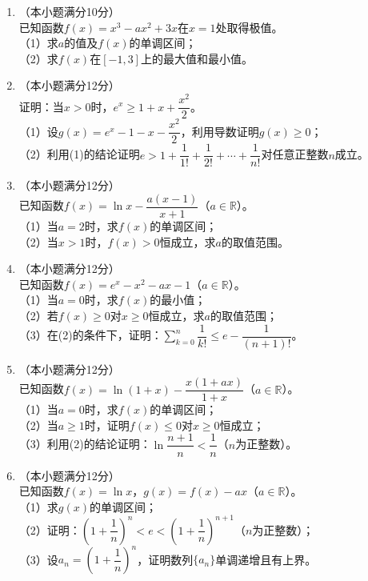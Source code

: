 \documentclass[12pt, a4paper]{ctexart}
\begin{document}
\begin{enumerate}[label=\arabic*.]

\item （本小题满分10分）\\
已知函数$f(x)=x^3-ax^2+3x$在$x=1$处取得极值。\\
（1）求$a$的值及$f(x)$的单调区间；\\
（2）求$f(x)$在$[-1,3]$上的最大值和最小值。
\vspace{6cm}

\item （本小题满分12分）\\
证明：当$x>0$时，$e^x\geq 1+x+\dfrac{x^2}{2}$。\\
（1）设$g(x)=e^x-1-x-\dfrac{x^2}{2}$，利用导数证明$g(x)\geq 0$；\\
（2）利用(1)的结论证明$e>1+\dfrac{1}{1!}+\dfrac{1}{2!}+\cdots+\dfrac{1}{n!}$对任意正整数$n$成立。
\vspace{6cm}

\item （本小题满分12分）\\
已知函数$f(x)=\ln x-\dfrac{a(x-1)}{x+1}$（$a\in\mathbb{R}$）。\\
（1）当$a=2$时，求$f(x)$的单调区间；\\
（2）当$x>1$时，$f(x)>0$恒成立，求$a$的取值范围。
\vspace{6cm}

\item （本小题满分12分）\\
已知函数$f(x)=e^x-x^2-ax-1$（$a\in\mathbb{R}$）。\\
（1）当$a=0$时，求$f(x)$的最小值；\\
（2）若$f(x)\geq 0$对$x\geq 0$恒成立，求$a$的取值范围；\\
（3）在(2)的条件下，证明：$\displaystyle\sum_{k=0}^{n}\dfrac{1}{k!}\leq e-\dfrac{1}{(n+1)!}$。
\vspace{6cm}

\item （本小题满分12分）\\
已知函数$f(x)=\ln(1+x)-\dfrac{x(1+ax)}{1+x}$（$a\in\mathbb{R}$）。\\
（1）当$a=0$时，求$f(x)$的单调区间；\\
（2）当$a\geq 1$时，证明$f(x)\leq 0$对$x\geq 0$恒成立；\\
（3）利用(2)的结论证明：$\ln\dfrac{n+1}{n}<\dfrac{1}{n}$（$n$为正整数）。
\vspace{6cm}

\item （本小题满分12分）\\
已知函数$f(x)=\ln x$，$g(x)=f(x)-ax$（$a\in\mathbb{R}$）。\\
（1）求$g(x)$的单调区间；\\
（2）证明：$\left(1+\dfrac{1}{n}\right)^n<e<\left(1+\dfrac{1}{n}\right)^{n+1}$（$n$为正整数）；\\
（3）设$a_n=\left(1+\dfrac{1}{n}\right)^n$，证明数列$\{a_n\}$单调递增且有上界。
\vspace{6cm}

\end{enumerate}
\end{document}
